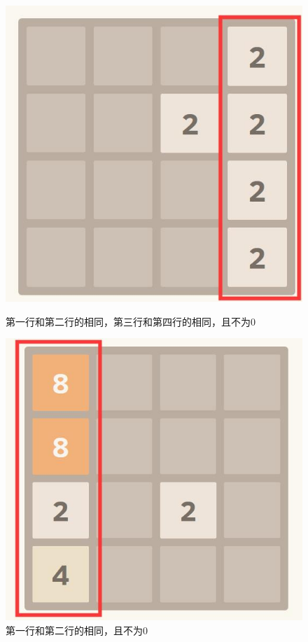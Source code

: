 \documentclass[UTF8]{article}
\begin{document}
	\begin{figure}[H]
		\begin{minipage}[H]{0.36\linewidth}
			\centering
			\includegraphics[scale=0.30]{12_34.jpg}
			\caption{第一行和第二行的相同，第三行和第四行的相同，且不为0}
			\label{12_34}
		\end{minipage}
		\qquad
		\begin{minipage}[H]{0.36\linewidth}
			\centering
			\includegraphics[scale=0.30]{12.jpg}
			\caption{第一行和第二行的相同，且不为0}
			\label{12}
		\end{minipage}
	\end{figure}
\end{document}
